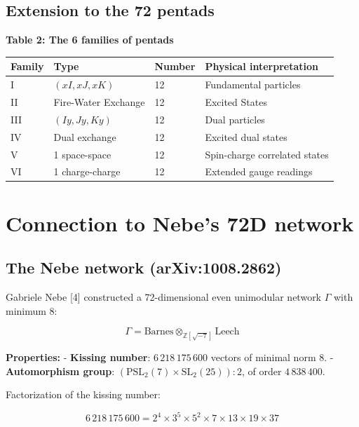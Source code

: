 \documentclass[11pt]{article}
\begin{document}
\hypertarget{extension-to-the-72-pentads}{%
\subsection{Extension to the 72
pentads}\label{extension-to-the-72-pentads}}

\textbf{Table 2: The 6 families of pentads}

\begin{longtable}[]{@{}llll@{}}
\toprule
Family & Type & Number & Physical interpretation \\
\midrule
\endhead
I & \((xI, xJ, xK)\) & 12 & Fundamental particles \\
II & Fire-Water Exchange & 12 & Excited States \\
III & \((Iy, Jy, Ky)\) & 12 & Dual particles \\
IV & Dual exchange & 12 & Excited dual states \\
V & 1 space-space & 12 & Spin-charge correlated states \\
VI & 1 charge-charge & 12 & Extended gauge readings \\
\bottomrule
\end{longtable}

\hypertarget{connection-to-nebes-72d-network}{%
\section{Connection to Nebe's 72D
network}\label{connection-to-nebes-72d-network}}

\hypertarget{the-nebe-network-arxiv1008.2862}{%
\subsection{The Nebe network
(arXiv:1008.2862)}\label{the-nebe-network-arxiv1008.2862}}

Gabriele Nebe {[}4{]} constructed a 72-dimensional even unimodular
network \(\Gamma\) with minimum 8:

\[\Gamma = \text{Barnes} \otimes_{\mathbb{Z}[\sqrt{-7}]} \text{Leech}\]

\textbf{Properties:} - \textbf{Kissing number}: \(6\,218\,175\,600\)
vectors of minimal norm 8. - \textbf{Automorphism group}:
\((\text{PSL}_2(7) \times \text{SL}_2(25)):2\), of order
\(4\,838\,400\).

Factorization of the kissing number:

\[6\,218\,175\,600 = 2^4 \times 3^5 \times 5^2 \times 7 \times 13 \times 19 \times 37\]
\end{document}
